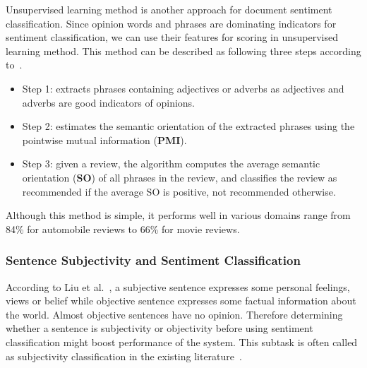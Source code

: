 \documentclass{article}
\begin{document}
Unsupervised learning method is another approach for document sentiment classification. 
Since opinion words and phrases are dominating indicators for sentiment classification, we can use their features for scoring in unsupervised learning method.
This method can be described as following three steps according to~\cite{DBLP:journals/corr/cs-LG-0212032}.
\begin{itemize}
	\item Step 1: extracts phrases containing adjectives or adverbs as adjectives and adverbs are good indicators of opinions.
	\item Step 2: estimates the semantic orientation of the extracted phrases using the pointwise mutual information (\textbf{PMI}).
	\item Step 3: given a review, the algorithm computes the average semantic orientation (\textbf{SO}) of all phrases in the review, and classifies the review as recommended if the average SO is positive, not recommended otherwise.
\end{itemize}
Although this method is simple, it performs well in various domains range from 84\% for automobile reviews to 66\% for movie reviews.

\subsubsection{Sentence Subjectivity and Sentiment Classification}
According to Liu et al.~\cite{Liu2012}, a subjective sentence expresses some personal feelings, views or belief while objective sentence expresses some factual information about the world.
Almost objective sentences have no opinion.
Therefore determining whether a sentence is subjectivity or objectivity before using sentiment classification might boost performance of the system.
This subtask is often called as subjectivity classification in the existing literature~\cite{Hatzivassiloglou:2000:EAO:990820.990864, Pang:2005:SSE:1219840.1219855, Pang:2002:TUS:1118693.1118704, Wiebe:2004:LSL:1105596.1105598, Wilson:2004:JMY:1597148.1597270, COIN:COIN275, Yu:2003:TAO:1119355.1119372}. 
\end{document}
